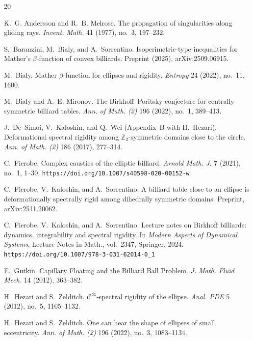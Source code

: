 \documentclass[a4paper]{article}
\theoremstyle{definition}
\begin{document}
\begin{thebibliography}{20}

K.~G. Andersson and R.~B. Melrose.
\newblock The propagation of singularities along gliding rays.
\newblock \emph{Invent. Math.} 41 (1977), no.~3, 197--232.

S.~Baranzini, M.~Bialy, and A.~Sorrentino.
\newblock Isoperimetric-type inequalities for Mather's $\beta$-function of convex billiards.
\newblock Preprint (2025), arXiv:2509.06915.

M.~Bialy.
\newblock Mather $\beta$-function for ellipses and rigidity.
\newblock \emph{Entropy} 24 (2022), no.~11, 1600.

M.~Bialy and A.~E. Mironov.
\newblock The Birkhoff--Poritsky conjecture for centrally symmetric billiard tables.
\newblock \emph{Ann. of Math. (2)} 196 (2022), no.~1, 389--413.

J.~De~Simoi, V.~Kaloshin, and Q.~Wei (Appendix~B with H.~Hezari).
\newblock Deformational spectral rigidity among $\mathbb Z_2$-symmetric domains close to the circle.
\newblock \emph{Ann. of Math. (2)} 186 (2017), 277--314.

C.~Fierobe.
\newblock Complex caustics of the elliptic billiard.
\newblock \emph{Arnold Math. J.} 7 (2021), no.~1, 1--30.
\newblock \texttt{https://doi.org/10.1007/s40598-020-00152-w}

C.~Fierobe, V.~Kaloshin, and A.~Sorrentino.
\newblock A billiard table close to an ellipse is deformationally spectrally rigid among dihedrally symmetric domains.
\newblock Preprint, arXiv:2511.20062.

C.~Fierobe, V.~Kaloshin, and A.~Sorrentino.
\newblock Lecture notes on Birkhoff billiards: dynamics, integrability and spectral rigidity.
\newblock In \emph{Modern Aspects of Dynamical Systems}, Lecture Notes in Math., vol.~2347,
Springer, 2024.
\newblock \texttt{https://doi.org/10.1007/978-3-031-62014-0\_1}

E.~Gutkin. 
\newblock Capillary Floating and the Billiard Ball Problem. 
\newblock \emph{J. Math. Fluid Mech.} 14 (2012), 363--382.

H.~Hezari and S.~Zelditch.
\newblock $\mathscr C^{\infty}$-spectral rigidity of the ellipse.
\newblock \emph{Anal. PDE} 5 (2012), no.~5, 1105--1132.

H.~Hezari and S.~Zelditch.
\newblock One can hear the shape of ellipses of small eccentricity.
\newblock \emph{Ann. of Math. (2)} 196 (2022), no.~3, 1083--1134.


\end{thebibliography}
\end{document}
